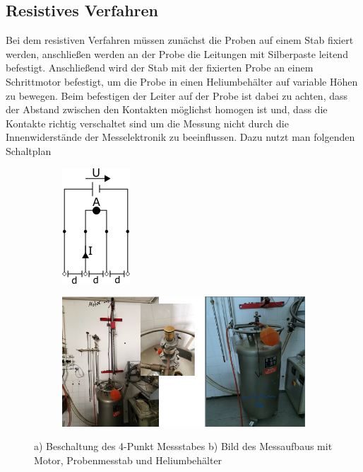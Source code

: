     \subsection*{Resistives Verfahren}
    Bei dem resistiven Verfahren müssen zunächst die Proben auf einem Stab fixiert werden, anschließen werden
    an der Probe die Leitungen mit Silberpaste leitend befestigt. Anschließend wird der Stab mit der fixierten
    Probe an einem Schrittmotor befestigt, um die Probe in einen Heliumbehälter auf variable Höhen zu bewegen.
    Beim befestigen der Leiter auf der Probe ist dabei zu achten, dass der Abstand zwischen den Kontakten möglichst
    homogen ist und, dass die Kontakte richtig verschaltet sind um die Messung nicht durch die Innenwiderstände
    der Messelektronik zu beeinflussen. Dazu nutzt man folgenden Schaltplan
    \begin{figure}[H]
        \centering
        \begin{subfigure}{.5\textwidth}
        \centering
        \includegraphics[width=.4\linewidth]{images/schaltplan.png}
        \caption{}
        \label{fig:sub11}
        \end{subfigure}%
        \begin{subfigure}{.5\textwidth}
        \centering
        \includegraphics[width=.8\linewidth]{images/aufbaures.png}
        \caption{}
        \label{fig:sub22}
        \end{subfigure} 
        \caption{a) Beschaltung des 4-Punkt Messstabes b) Bild des Messaufbaus mit Motor, Probenmesstab und Heliumbehälter}
        \label{fig:test1}
    \end{figure}

